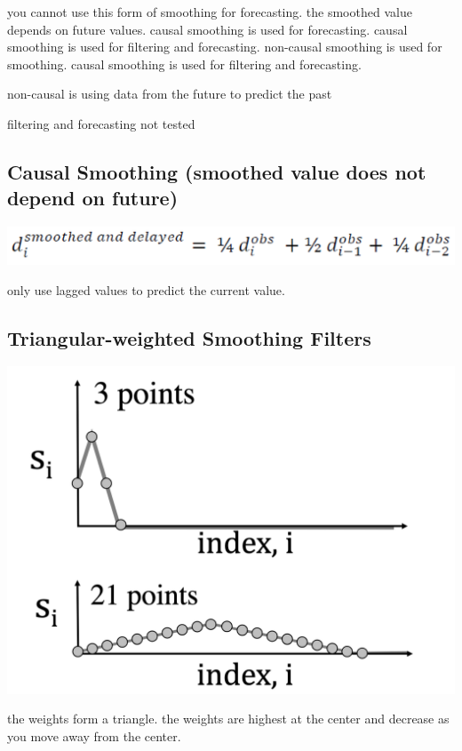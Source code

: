 \documentclass[11pt]{article}
\theoremstyle{definition}
\begin{document}
you cannot use this form of smoothing for forecasting. the smoothed value depends on future values. causal smoothing is used for forecasting. causal smoothing is used for filtering and forecasting. non-causal smoothing is used for smoothing. causal smoothing is used for filtering and forecasting. 

non-causal is using data from the future to predict the past

filtering and forecasting not tested

\subsection{Causal Smoothing
(smoothed value does not depend on future)}
\includegraphics[width = \textwidth/2]{16.png}

only use lagged values to predict the current value.

\subsection{Triangular-weighted Smoothing Filters}
\includegraphics[width = \textwidth/2]{17.png}

the weights form a triangle. the weights are highest at the center and decrease as you move away from the center.
\end{document}

